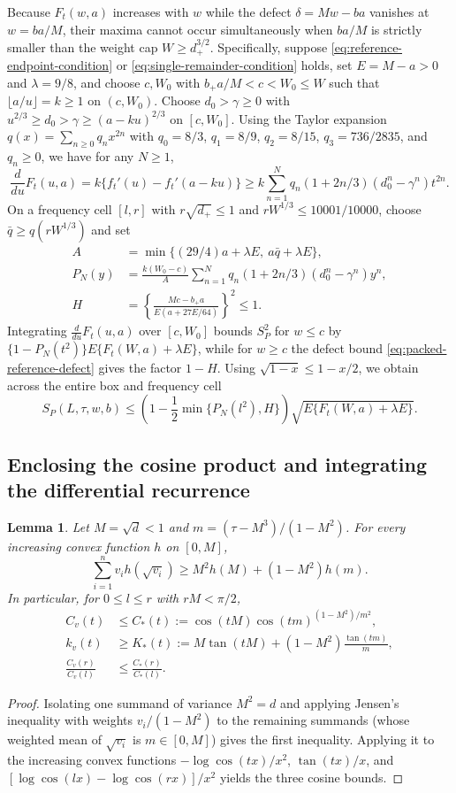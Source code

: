 \documentclass[11pt]{article}
\numberwithin{equation}{section}
\newtheorem{lemma}[theorem]{Lemma}
\theoremstyle{remark}
\begin{document}
Because $F_t(w,a)$ increases with $w$ while the defect $\delta=Mw-ba$
vanishes at $w=ba/M$, their maxima cannot occur simultaneously when
$ba/M$ is strictly smaller than the weight cap $W\ge d_+^{3/2}$. Specifically,
suppose \eqref{eq:reference-endpoint-condition} or \eqref{eq:single-remainder-condition}
holds, set $E=M-a>0$ and $\lambda=9/8$, and choose $c,W_0$ with
$b_+a/M<c<W_0\le W$ such that $\lfloor a/u\rfloor=k\ge1$ on $(c,W_0)$.
Choose $d_0>\gamma\ge0$ with $u^{2/3}\ge d_0>\gamma\ge(a-ku)^{2/3}$ on
$[c,W_0]$. Using the Taylor expansion $q(x)=\sum_{n\ge0}q_nx^{2n}$ with
$q_0=8/3$, $q_1=8/9$, $q_2=8/15$, $q_3=736/2835$, and $q_n\ge0$, we have for
any $N\ge1$,
\[
 \frac{d}{du}F_t(u,a)
 =k\{f_t'(u)-f_t'(a-ku)\}
 \ge k\sum_{n=1}^Nq_n(1+2n/3)(d_0^n-\gamma^n)t^{2n}.
\]
On a frequency cell $[l,r]$ with $r\sqrt{d_+}\le1$ and $rW^{1/3}\le10001/10000$,
choose $\bar q\ge q(rW^{1/3})$ and set
\begin{align*}
 A&=\min\{(29/4)a+\lambda E,\ a\bar q+\lambda E\},\\
 P_N(y)&=\frac{k(W_0-c)}A
       \sum_{n=1}^Nq_n(1+2n/3)(d_0^n-\gamma^n)y^n,\\
 H&=\left\{\frac{Mc-b_+a}{E(a+27E/64)}\right\}^2\le1.
\end{align*}
Integrating $\frac{d}{du}F_t(u,a)$ over $[c,W_0]$ bounds $S_P^2$ for
$w\le c$ by $\{1-P_N(t^2)\}E\{F_t(W,a)+\lambda E\}$, while for $w\ge c$ the
defect bound \eqref{eq:packed-reference-defect} gives the factor $1-H$. Using
$\sqrt{1-x}\le1-x/2$, we obtain across the entire box and frequency cell
\begin{equation}\label{eq:weight-loss}
 S_P(L,\tau,w,b)
 \le
 \left(1-\frac12\min\{P_N(l^2),H\}\right)
       \sqrt{E\{F_t(W,a)+\lambda E\}}.
\end{equation}

\subsection{Enclosing the cosine product and integrating the differential recurrence}

\begin{lemma}\label{lem:current-maximum}
Let $M=\sqrt d<1$ and $m=(\tau-M^3)/(1-M^2)$. For every increasing convex
function $h$ on $[0,M]$,
\[
 \sum_{i=1}^n v_ih(\sqrt{v_i})\ge M^2h(M)+(1-M^2)h(m).
\]
In particular, for $0\le l\le r$ with $rM<\pi/2$,
\begin{align*}
 C_v(t)&\le C_*(t):=\cos(tM)\cos(tm)^{(1-M^2)/m^2},\\
 k_v(t)&\ge K_*(t):=M\tan(tM)+(1-M^2)\frac{\tan(tm)}{m},\\
 \frac{C_v(r)}{C_v(l)}&\le \frac{C_*(r)}{C_*(l)}.
\end{align*}
\end{lemma}
\begin{proof}
Isolating one summand of variance $M^2=d$ and applying Jensen's inequality
with weights $v_i/(1-M^2)$ to the remaining summands (whose weighted mean of
$\sqrt{v_i}$ is $m\in[0,M]$) gives the first inequality. Applying it to the
increasing convex functions $-\log\cos(tx)/x^2$, $\tan(tx)/x$, and
$[\log\cos(lx)-\log\cos(rx)]/x^2$ yields the three cosine bounds.
\end{proof}
\end{document}
